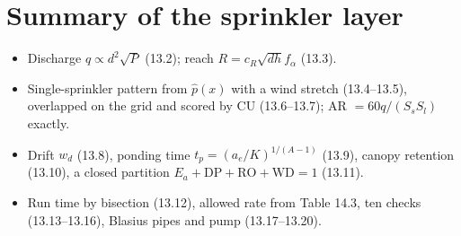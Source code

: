 \section{Summary of the sprinkler layer}
\begin{itemize}
\item Discharge $q\propto d^2\sqrt P$ (13.2); reach $R=c_R\sqrt{dh}f_\alpha$ (13.3).
\item Single-sprinkler pattern from $\hat p(x)$ with a wind stretch (13.4--13.5), overlapped on the grid and scored by CU (13.6--13.7); AR $=60q/(S_sS_l)$ exactly.
\item Drift $w_d$ (13.8), ponding time $t_p=(a_e/K)^{1/(A-1)}$ (13.9), canopy retention (13.10), a closed partition $E_a+\mathrm{DP}+\mathrm{RO}+\mathrm{WD}=1$ (13.11).
\item Run time by bisection (13.12), allowed rate from Table 14.3, ten checks (13.13--13.16), Blasius pipes and pump (13.17--13.20).
\end{itemize}
